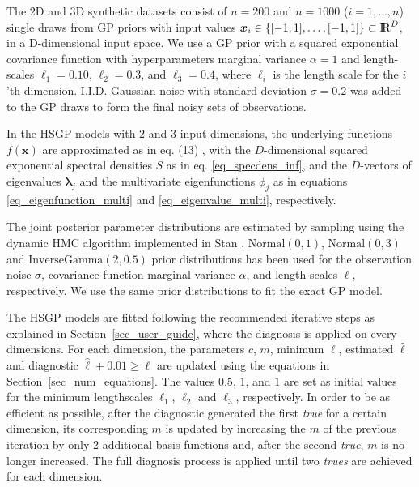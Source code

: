 The $2$D and $3$D synthetic datasets consist of $n=200$ and $n=1000$ ($i=1,\dots,n$) single draws from GP priors with input values $\bm{x}_i \in \{[-1,1],\dots,[-1,1]\} \subset {\rm I\!R}^D$, in a D-dimensional input space. We use a GP prior with a squared exponential covariance function with hyperparameters marginal variance $\alpha=1$ and length-scales $\ell_1=0.10$, $\ell_2=0.3$, and $\ell_3=0.4$, where $\ell_i$ is the length scale for the $i$'th dimension. I.I.D. Gaussian noise with standard deviation $\sigma=0.2$ was added to the GP draws to form the final noisy sets of observations.

In the HSGP models with $2$ and $3$ input dimensions, the underlying functions $f(\bm{x})$ are approximated as in eq. (13)%
, with the $D$-dimensional squared exponential spectral densities $S$ as in eq. \eqref{eq_specdens_inf}, and the $D$-vectors of eigenvalues $\bm{\lambda}_j$ and the multivariate eigenfunctions $\phi_j$ as in equations \eqref{eq_eigenfunction_multi} and \eqref{eq_eigenvalue_multi}, respectively.

The joint posterior parameter distributions are estimated by sampling using the dynamic HMC algorithm implemented in Stan \citep{StanTeam:2021}. $\mathrm{Normal}(0,1)$, $\mathrm{Normal}(0,3)$ and $\mathrm{InverseGamma}(2,0.5)$ prior distributions has been used for the observation noise $\sigma$, covariance function marginal variance $\alpha$, and length-scales $\ell$, respectively. We use the same prior distributions to fit the exact GP model.

The HSGP models are fitted following the recommended iterative steps as explained in Section~\ref{sec_user_guide}, where the diagnosis is applied on every dimensions. For each dimension, the parameters $c$, $m$, minimum $\ell$, estimated $\hat{\ell}$ and diagnostic $\hat{\ell} + 0.01 \geq \ell$ are updated using the equations in Section~\ref{sec_num_equations}. The values $0.5$, $1$, and $1$ are set as initial values for the minimum lengthscales $\ell_1$, $\ell_2$ and $\ell_3$, respectively. In order to be as efficient as possible, after the diagnostic generated the first \textit{true} for a certain dimension, its corresponding $m$ is updated by increasing the $m$ of the previous iteration by only 2 additional basis functions and, after the second \textit{true}, $m$ is no longer increased. The full diagnosis process is applied until two \textit{trues} are achieved for each dimension. 

